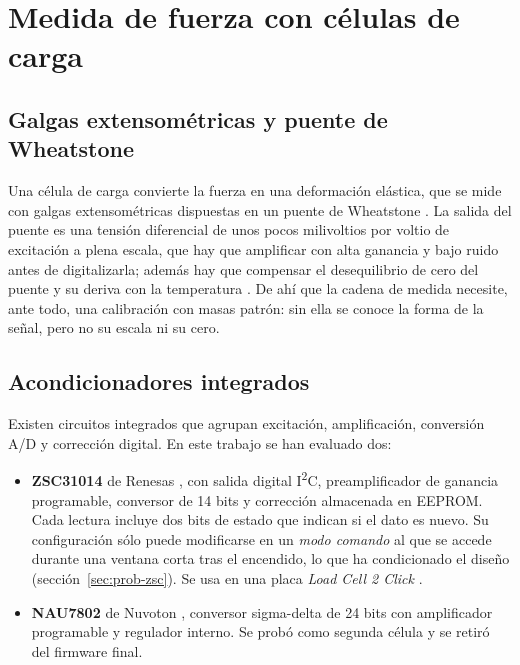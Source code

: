 \section{Medida de fuerza con células de carga}

\subsection{Galgas extensométricas y puente de Wheatstone}

Una célula de carga convierte la fuerza en una deformación elástica, que se mide con galgas
extensométricas dispuestas en un puente de Wheatstone \cite{hoffmann2012}. La salida del puente es
una tensión diferencial de unos pocos milivoltios por voltio de excitación a plena escala, que hay
que amplificar con alta ganancia y bajo ruido antes de digitalizarla; además hay que compensar el
desequilibrio de cero del puente y su deriva con la temperatura \cite{pallas2001}. De ahí que la
cadena de medida necesite, ante todo, una calibración con masas patrón: sin ella se conoce la forma
de la señal, pero no su escala ni su cero.

\subsection{Acondicionadores integrados}

Existen circuitos integrados que agrupan excitación, amplificación, conversión A/D y corrección
digital. En este trabajo se han evaluado dos:

\begin{itemize}
  \item \textbf{ZSC31014} de Renesas \cite{zsc31014}, con salida digital I\textsuperscript{2}C,
        preamplificador de ganancia programable, conversor de 14 bits y corrección almacenada en
        EEPROM. Cada lectura incluye dos bits de estado que indican si el dato es nuevo. Su
        configuración sólo puede modificarse en un \emph{modo comando} al que se accede durante una
        ventana corta tras el encendido, lo que ha condicionado el diseño
        (sección~\ref{sec:prob-zsc}). Se usa en una placa \emph{Load Cell 2 Click}
        \cite{mikroelc2}.
  \item \textbf{NAU7802} de Nuvoton \cite{nau7802}, conversor sigma-delta de 24 bits con
        amplificador programable y regulador interno. Se probó como segunda célula y se retiró del
        firmware final.
\end{itemize}


